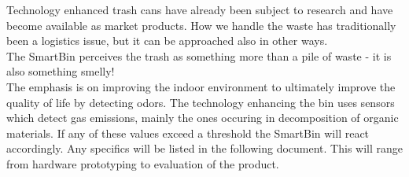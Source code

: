 Technology enhanced trash cans have already been subject to research and have become available as market products.
How we handle the waste has traditionally been a logistics issue, but it can be approached also in other ways. \\
The SmartBin perceives the trash as something more than a pile of waste - it is also something smelly!\\
The emphasis is on improving the indoor environment to ultimately improve the quality of life by detecting odors.
The technology enhancing the bin uses sensors which detect gas emissions, mainly the ones occuring in decomposition of organic materials.
If any of these values exceed a threshold the SmartBin will react accordingly.
Any specifics will be listed in the following document. This will range from hardware prototyping to evaluation of the product.